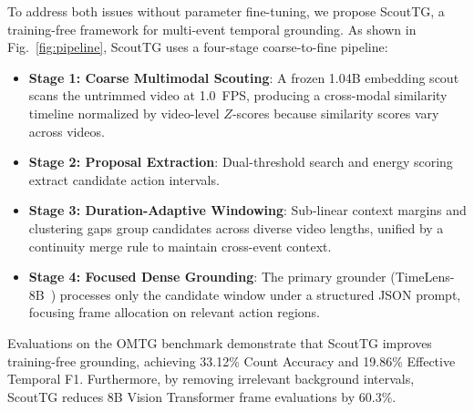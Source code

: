 To address both issues without parameter fine-tuning, we propose ScoutTG, a training-free framework for multi-event temporal grounding. As shown in Fig.~\ref{fig:pipeline}, ScoutTG uses a four-stage coarse-to-fine pipeline:
\begin{itemize}
    \item \textbf{Stage 1: Coarse Multimodal Scouting}: A frozen 1.04B embedding scout scans the untrimmed video at 1.0~FPS, producing a cross-modal similarity timeline normalized by video-level $Z$-scores because similarity scores vary across videos.
    \item \textbf{Stage 2: Proposal Extraction}: Dual-threshold search and energy scoring extract candidate action intervals.
    \item \textbf{Stage 3: Duration-Adaptive Windowing}: Sub-linear context margins and clustering gaps group candidates across diverse video lengths, unified by a continuity merge rule to maintain cross-event context.
    \item \textbf{Stage 4: Focused Dense Grounding}: The primary grounder (TimeLens-8B~\cite{timelens2024}) processes only the candidate window under a structured JSON prompt, focusing frame allocation on relevant action regions.
\end{itemize}

Evaluations on the OMTG benchmark demonstrate that ScoutTG improves training-free grounding, achieving 33.12\% Count Accuracy and 19.86\% Effective Temporal F1. Furthermore, by removing irrelevant background intervals, ScoutTG reduces 8B Vision Transformer frame evaluations by 60.3\%.

